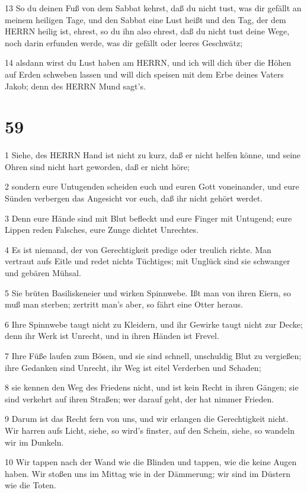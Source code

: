 \par 13 So du deinen Fuß von dem Sabbat kehrst, daß du nicht tust, was dir gefällt an meinem heiligen Tage, und den Sabbat eine Lust heißt und den Tag, der dem HERRN heilig ist, ehrest, so du ihn also ehrest, daß du nicht tust deine Wege, noch darin erfunden werde, was dir gefällt oder leeres Geschwätz;
\par 14 alsdann wirst du Lust haben am HERRN, und ich will dich über die Höhen auf Erden schweben lassen und will dich speisen mit dem Erbe deines Vaters Jakob; denn des HERRN Mund sagt's.

\chapter{59}

\par 1 Siehe, des HERRN Hand ist nicht zu kurz, daß er nicht helfen könne, und seine Ohren sind nicht hart geworden, daß er nicht höre;
\par 2 sondern eure Untugenden scheiden euch und euren Gott voneinander, und eure Sünden verbergen das Angesicht vor euch, daß ihr nicht gehört werdet.
\par 3 Denn eure Hände sind mit Blut befleckt und eure Finger mit Untugend; eure Lippen reden Falsches, eure Zunge dichtet Unrechtes.
\par 4 Es ist niemand, der von Gerechtigkeit predige oder treulich richte. Man vertraut aufs Eitle und redet nichts Tüchtiges; mit Unglück sind sie schwanger und gebären Mühsal.
\par 5 Sie brüten Basiliskeneier und wirken Spinnwebe. Ißt man von ihren Eiern, so muß man sterben; zertritt man's aber, so fährt eine Otter heraus.
\par 6 Ihre Spinnwebe taugt nicht zu Kleidern, und ihr Gewirke taugt nicht zur Decke; denn ihr Werk ist Unrecht, und in ihren Händen ist Frevel.
\par 7 Ihre Füße laufen zum Bösen, und sie sind schnell, unschuldig Blut zu vergießen; ihre Gedanken sind Unrecht, ihr Weg ist eitel Verderben und Schaden;
\par 8 sie kennen den Weg des Friedens nicht, und ist kein Recht in ihren Gängen; sie sind verkehrt auf ihren Straßen; wer darauf geht, der hat nimmer Frieden.
\par 9 Darum ist das Recht fern von uns, und wir erlangen die Gerechtigkeit nicht. Wir harren aufs Licht, siehe, so wird's finster, auf den Schein, siehe, so wandeln wir im Dunkeln.
\par 10 Wir tappen nach der Wand wie die Blinden und tappen, wie die keine Augen haben. Wir stoßen uns im Mittag wie in der Dämmerung; wir sind im Düstern wie die Toten.

